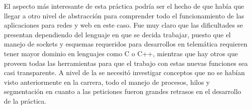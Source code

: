 El aspecto más interesante de esta práctica podría ser el hecho de que había que llegar a otro nivel de abstracción para comprender todo el
funcionamiento de las aplicaciones para redes y web en este caso. Fue muy claro que las dificultades se presentan dependiendo del lenguaje en 
que se decida trabajar, puesto que el manejo de sockets y esquemas requeridos para desarrollos en telemática requieren tener mayor dominio en
lenguajes como C o C++, mientras que hay otros que proveen todas las herramientas para que el trabajo con estas nuevas funciones sea casi
transparente.
A nivel de la se necesitó investigar conceptos que no se habían visto anteriormente en la carrera, todo el manejo de procesos, hilos y segmentación en
cuanto a las peticiones fueron grandes retrasos en el desarrollo de la práctica.